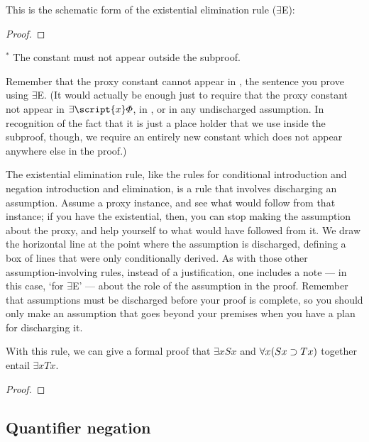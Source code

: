 This is the schematic form of the existential elimination rule ($\exists$E): 

\begin{proof}
	\open	
		 
	\close
	 
\end{proof}
$^\ast$ The constant  must not appear outside the subproof.

Remember that the proxy constant cannot appear in \metaB{}, the sentence you prove using $\exists$E. (It would actually be enough just to require that the proxy constant not appear in $\exists\script{x}\metaA{}$, in \metaB{}, or in any undischarged assumption. In recognition of the fact that it is just a place holder that we use inside the subproof, though, we require an entirely new constant which does not appear anywhere else in the proof.)

The existential elimination rule, like the rules for conditional introduction and negation introduction and elimination, is a rule that involves discharging an assumption. Assume a proxy instance, and see what would follow from that instance; if you have the existential, then, you can stop making the assumption about the proxy, and help yourself to what would have followed from it. We draw the horizontal line at the point where the assumption is discharged, defining a box of lines that were only conditionally derived. As with those other assumption-involving rules, instead of a justification, one includes a note --- in this case, `for $\exists${}E' --- about the role of the assumption in the proof. Remember that assumptions must be discharged before your proof is complete, so you should only make an assumption that goes beyond your premises when you have a plan for discharging it.


With this rule, we can give a formal proof that $\exists x Sx$ and $\forall x(Sx \supset Tx)$ together entail $\exists x Tx$.

\begin{proof}
	\open
		 
	\close
\end{proof}

\subsection{Quantifier negation}

